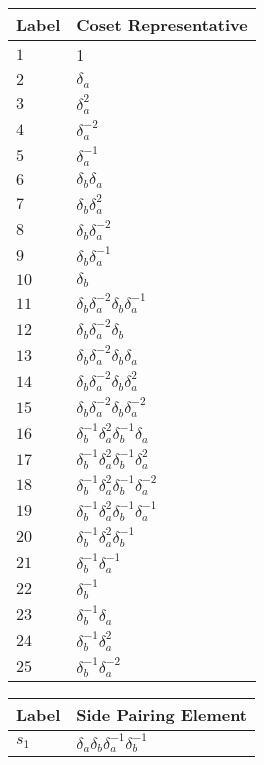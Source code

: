 \documentclass{article}
\begin{document}

\begin{center}
\begin{tabular}{ll}
\toprule
Label & Coset Representative\\
\midrule
$1$ & 1 \\
$2$ & $\delta_a^{}$ \\
$3$ & $\delta_a^{2}$ \\
$4$ & $\delta_a^{-2}$ \\
$5$ & $\delta_a^{-1}$ \\
$6$ & $\delta_b^{}\delta_a^{}$ \\
$7$ & $\delta_b^{}\delta_a^{2}$ \\
$8$ & $\delta_b^{}\delta_a^{-2}$ \\
$9$ & $\delta_b^{}\delta_a^{-1}$ \\
$10$ & $\delta_b^{}$ \\
$11$ & $\delta_b^{}\delta_a^{-2}\delta_b^{}\delta_a^{-1}$ \\
$12$ & $\delta_b^{}\delta_a^{-2}\delta_b^{}$ \\
$13$ & $\delta_b^{}\delta_a^{-2}\delta_b^{}\delta_a^{}$ \\
$14$ & $\delta_b^{}\delta_a^{-2}\delta_b^{}\delta_a^{2}$ \\
$15$ & $\delta_b^{}\delta_a^{-2}\delta_b^{}\delta_a^{-2}$ \\
$16$ & $\delta_b^{-1}\delta_a^{2}\delta_b^{-1}\delta_a^{}$ \\
$17$ & $\delta_b^{-1}\delta_a^{2}\delta_b^{-1}\delta_a^{2}$ \\
$18$ & $\delta_b^{-1}\delta_a^{2}\delta_b^{-1}\delta_a^{-2}$ \\
$19$ & $\delta_b^{-1}\delta_a^{2}\delta_b^{-1}\delta_a^{-1}$ \\
$20$ & $\delta_b^{-1}\delta_a^{2}\delta_b^{-1}$ \\
$21$ & $\delta_b^{-1}\delta_a^{-1}$ \\
$22$ & $\delta_b^{-1}$ \\
$23$ & $\delta_b^{-1}\delta_a^{}$ \\
$24$ & $\delta_b^{-1}\delta_a^{2}$ \\
$25$ & $\delta_b^{-1}\delta_a^{-2}$ \\
\bottomrule
\end{tabular}
\hfill
\begin{tabular}{ll}
\toprule
Label & Side Pairing Element\\
\midrule
$s_{1}$ & $\delta_a^{}\delta_b^{}\delta_a^{-1}\delta_b^{-1}$ \\

\end{tabular}
\end{center}
\end{document}
